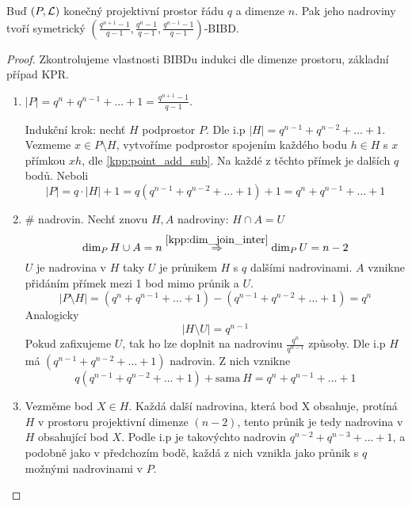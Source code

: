 \begin{theorem}
    Buď $(P,\operatorname{\mathcal{L}})$ konečný projektivní prostor řádu $q$ a dimenze $n$.
    Pak jeho nadroviny tvoří symetrický $(\frac{q^{n+1}-1}{q-1},\frac{q^n-1}{q-1},\frac{q^{n-1}-1}{q-1})$-BIBD.
\end{theorem}
\begin{proof}
	Zkontrolujeme vlastnosti BIBDu indukci dle dimenze prostoru, základní případ KPR.
    \begin{enumerate}
	    \item $|P| = q^n + q^{n - 1} + \ldots + 1 = \frac{q^{n+1}-1}{q-1}$.

		    Indukční krok: nechť $H$ podprostor $P$.
		    Dle i.p $|H| = q^{n - 1} + q^{n - 2} + \ldots + 1$.
		    Vezmeme $x \in P \setminus H$, vytvoříme podprostor spojením každého bodu $h \in H$ s $x$ přímkou $xh$, dle \cref{kpp:point_add_sub}.
		    Na každé z těchto přímek je dalších $q$ bodů.
		    Neboli
		    \[ |P| = q \cdot |H| + 1 = q(q^{n - 1} + q^{n - 2} + \ldots + 1) + 1 = q^n + q^{n - 1} + \ldots + 1 \]
	    \item \# nadrovin.
		    Nechť znovu $H, A$ nadroviny: $H \cap A = U$
		    \[ \dim_P H \cup A = n \stackrel{\cref{kpp:dim_join_inter}}{\Rightarrow} \dim_P U = n - 2 \]
		    $U$ je nadrovina v $H$ taky $U$ je průnikem $H$ s $q$ dalšími nadrovinami.
		    $A$ vznikne přidáním přímek mezi 1 bod mimo průnik a $U$.
		    \[ |P \setminus H| = (q^n + q^{n - 1} + \ldots + 1) - (q^{n - 1} + q^{n - 2} + \ldots + 1) = q^n \]
		    Analogicky
		    \[ |H \setminus U| = q^{n - 1} \]
		    Pokud zafixujeme $U$, tak ho lze doplnit na nadrovinu $\frac{q^n}{q^{n - 1}}$ způsoby.
		    Dle i.p $H$ má $(q^{n - 1} + q^{n - 2} + \ldots + 1)$ nadrovin.
		    Z nich vznikne
		    \[ q(q^{n - 1} + q^{n - 2} + \ldots + 1) + \text{sama}\ H = q^n + q^{n - 1} + \ldots + 1 \]
	    \item Vezměme bod $X \in H$.
		    Každá další nadrovina, která bod X obsahuje, protíná $H$ v prostoru projektivní dimenze $(n - 2)$, tento průnik je tedy nadrovina v $H$ obsahující bod $X$.
		    Podle i.p je takovýchto nadrovin $q^{n-2} + q^{n-3} + \ldots + 1$, a podobně jako v předchozím bodě, každá z nich vznikla jako průnik s $q$ možnými nadrovinami v $P$.
    \end{enumerate}
\end{proof}


